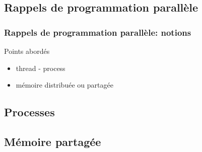 \documentclass{beamer}
\begin{document}
\begin{frame}
\section{Rappels de programmation parallèle}
\frametitle{Rappels de programmation parallèle: notions}
Points abord\'es
\begin{itemize}
\item thread - process
\item m\'emoire distribu\'ee ou partag\'ee
\end{itemize}
\end{frame}

\begin{frame}
	\subsection{Processes}
\end{frame}

\begin{frame}
	\subsection{M\'emoire partag\'ee}
\end{frame}
\end{document}
